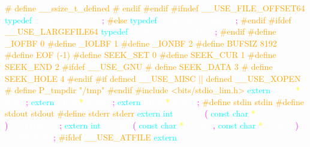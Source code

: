 \textcolor{orange}{\# define \_\_ssize\_t\_defined} 
\textcolor{orange}{\# endif} 
\textcolor{orange}{\#endif} 
\textcolor{orange}{\#ifndef \_\_USE\_FILE\_OFFSET64} 
\textcolor{cyan}{typedef} 
\textcolor{white}{\_\_fpos\_t} 
\textcolor{white}{fpos\_t} 
\textcolor{magenta}{;} 
\textcolor{orange}{\#else} 
\textcolor{cyan}{typedef} 
\textcolor{white}{\_\_fpos64\_t} 
\textcolor{white}{fpos\_t} 
\textcolor{magenta}{;} 
\textcolor{orange}{\#endif} 
\textcolor{orange}{\#ifdef \_\_USE\_LARGEFILE64} 
\textcolor{cyan}{typedef} 
\textcolor{white}{\_\_fpos64\_t} 
\textcolor{white}{fpos64\_t} 
\textcolor{magenta}{;} 
\textcolor{orange}{\#endif} 
\textcolor{orange}{\#define \_IOFBF 0		} 
\textcolor{orange}{\#define \_IOLBF 1		} 
\textcolor{orange}{\#define \_IONBF 2		} 
\textcolor{orange}{\#define BUFSIZ 8192} 
\textcolor{orange}{\#define EOF (-1)} 
\textcolor{orange}{\#define SEEK\_SET	0	} 
\textcolor{orange}{\#define SEEK\_CUR	1	} 
\textcolor{orange}{\#define SEEK\_END	2	} 
\textcolor{orange}{\#ifdef \_\_USE\_GNU} 
\textcolor{orange}{\# define SEEK\_DATA	3	} 
\textcolor{orange}{\# define SEEK\_HOLE	4	} 
\textcolor{orange}{\#endif} 
\textcolor{orange}{\#if defined \_\_USE\_MISC || defined \_\_USE\_XOPEN} 
\textcolor{orange}{\# define P\_tmpdir	"/tmp"} 
\textcolor{orange}{\#endif} 
\textcolor{orange}{\#include <bits/stdio\_lim.h>} 
\textcolor{cyan}{extern} 
\textcolor{white}{FILE} 
\textcolor{yellow}{*} 
\textcolor{white}{stdin} 
\textcolor{magenta}{;} 
\textcolor{cyan}{extern} 
\textcolor{white}{FILE} 
\textcolor{yellow}{*} 
\textcolor{white}{stdout} 
\textcolor{magenta}{;} 
\textcolor{cyan}{extern} 
\textcolor{white}{FILE} 
\textcolor{yellow}{*} 
\textcolor{white}{stderr} 
\textcolor{magenta}{;} 
\textcolor{orange}{\#define stdin stdin} 
\textcolor{orange}{\#define stdout stdout} 
\textcolor{orange}{\#define stderr stderr} 
\textcolor{cyan}{extern} 
\textcolor{cyan}{int} 
\textcolor{white}{remove} 
\textcolor{magenta}{(} 
\textcolor{cyan}{const} 
\textcolor{cyan}{char} 
\textcolor{yellow}{*} 
\textcolor{white}{\_\_filename} 
\textcolor{magenta}{)} 
\textcolor{white}{\_\_THROW} 
\textcolor{magenta}{;} 
\textcolor{cyan}{extern} 
\textcolor{cyan}{int} 
\textcolor{white}{rename} 
\textcolor{magenta}{(} 
\textcolor{cyan}{const} 
\textcolor{cyan}{char} 
\textcolor{yellow}{*} 
\textcolor{white}{\_\_old} 
\textcolor{magenta}{,} 
\textcolor{cyan}{const} 
\textcolor{cyan}{char} 
\textcolor{yellow}{*} 
\textcolor{white}{\_\_new} 
\textcolor{magenta}{)} 
\textcolor{white}{\_\_THROW} 
\textcolor{magenta}{;} 
\textcolor{orange}{\#ifdef \_\_USE\_ATFILE} 
\textcolor{cyan}{extern} 
